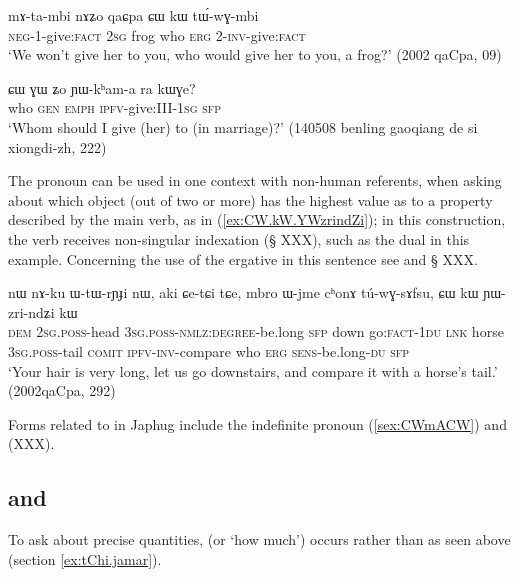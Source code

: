 \begin{exe}
\ex  \label{ex:CW.kW.tWwGmbi}
\gll  mɤ-ta-mbi nɤʑo qaɕpa ɕɯ kɯ tɯ́-wɣ-mbi    \\
\textsc{neg}-1-give:\textsc{fact} \textsc{2sg} frog who \textsc{erg} 2-\textsc{inv}-give:\textsc{fact}  \\
\glt `We won't give her to you, who would give her to you, a frog?'   (2002 qaCpa, 09)
\end{exe} 
 
\begin{exe}
\ex  \label{ex:CW.GW}
\gll  ɕɯ ɣɯ ʑo ɲɯ-kʰam-a ra kɯɣe?    \\
who \textsc{gen} \textsc{emph} \textsc{ipfv}-give:III-\textsc{1sg} \textsc{sfp} \\
\glt `Whom should I give (her) to (in marriage)?' (140508 benling gaoqiang de si xiongdi-zh, 222)
\end{exe}  

The pronoun   can be used in one context with non-human referents, when asking about which object (out of two or more) has the highest value as to a property described by the main verb, as in (\ref{ex:CW.kW.YWzrindZi}); in this construction, the verb receives non-singular indexation (§ XXX), such as the dual   in this example. Concerning the use of the ergative  in this sentence see \citet{jacques16comparative} and § XXX.  

\begin{exe}
\ex  \label{ex:CW.kW.YWzrindZi}
\gll nɯ nɤ-ku ɯ-tɯ-rɲɟi nɯ, aki ɕe-tɕi tɕe, mbro ɯ-jme cʰonɤ tú-wɣ-sɤfsu, ɕɯ kɯ ɲɯ-zri-ndʑi kɯ \\
\textsc{dem} \textsc{2sg}.\textsc{poss}-head \textsc{3sg}.\textsc{poss}-\textsc{nmlz}:\textsc{degree}-be.long  \textsc{sfp} down go:\textsc{fact}-\textsc{1du} \textsc{lnk} horse \textsc{3sg}.\textsc{poss}-tail \textsc{comit}  \textsc{ipfv}-\textsc{inv}-compare who \textsc{erg} \textsc{sens}-be.long-\textsc{du} \textsc{sfp} \\
\glt `Your hair is very long, let us go downstairs, and compare it with a horse's tail.' (2002qaCpa, 292)
\end{exe}  

Forms related to  in Japhug include the indefinite pronoun  (\ref{sex:CWmACW}) and  (XXX).

\subsection{ and } \label{sec:thAstWG}
To ask about precise quantities,  (or `how much') occurs rather than  as seen above (section \ref{ex:tChi.jamar}).

